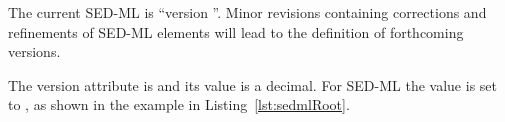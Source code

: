 \subsubsection{}
\label{sec:version}
The current SED-ML  is ``version \version''. Minor revisions containing corrections and refinements of SED-ML elements will lead to the definition of forthcoming versions.

The version attribute is  and its value is a  decimal. For SED-ML \LoneVtwo the value is set to , as shown in the example in Listing~\ref{lst:sedmlRoot}.

